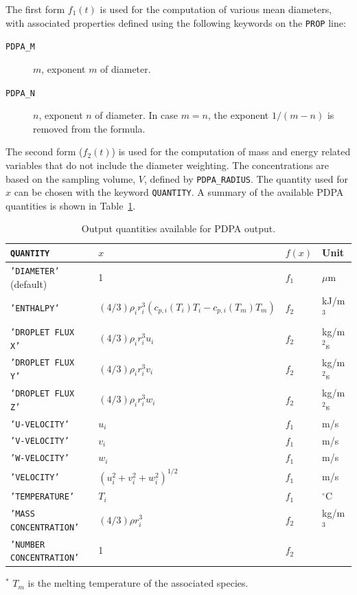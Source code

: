 \documentclass[11pt]{book}
\newcommand{\ct}{\tt\small}
\begin{document}
The first form $f_1(t)$ is used for the computation of various mean diameters, with
associated properties defined using the following keywords on the {\ct PROP} line:
\begin{description}
\item[{\ct PDPA\_M}] $m$, exponent $m$ of diameter.
\item[{\ct PDPA\_N}] $n$, exponent $n$ of diameter. In case $m=n$, the exponent $1/(m-n)$ is removed from the formula.
\end{description}
\noindent The second form ($f_2(t)$) is used for the computation of mass and energy related variables that do not include the diameter weighting.
The concentrations are based on the sampling volume, $V$, defined by {\ct PDPA\_RADIUS}.
The quantity used for $x$ can be chosen with the keyword {\ct QUANTITY}.
A summary of the available PDPA quantities is shown in Table~\ref{tbl:pdpa}.

\begin{table}[!ht]
\caption{Output quantities available for PDPA output.}
\label{tbl:pdpa}
\begin{center}
\begin{tabular}{|l|l|l|l|}
\hline
{\ct QUANTITY} 	        & $x$   			& $f(x)$ & Unit \\ \hline
{\ct 'DIAMETER'} (default) & 1                          & $f_1$	 & $\mu$m \\
{\ct 'ENTHALPY'} 	& $(4/3)\rho_i r_i^3 \left(c_{p,i}(T_i)T_i-c_{p,i}(T_m)T_m \right)$	& $f_2$	 & kJ/m$^3$ \\
{\ct 'DROPLET FLUX X'} 	& $(4/3)\rho_i r_i^3 u_i$ 	& $f_2$	 & kg/m$^2$s \\
{\ct 'DROPLET FLUX Y'} 	& $(4/3)\rho_i r_i^3 v_i$ 	& $f_2$	 & kg/m$^2$s \\
{\ct 'DROPLET FLUX Z'} 	& $(4/3)\rho_i r_i^3 w_i$ 	& $f_2$	 & kg/m$^2$s \\
{\ct 'U-VELOCITY'} 	& $u_i$ 			& $f_1$	 & m/s \\
{\ct 'V-VELOCITY'} 	& $v_i$ 			& $f_1$	 & m/s \\
{\ct 'W-VELOCITY'}	& $w_i$ 			& $f_1$	 & m/s \\
{\ct 'VELOCITY'} 	& $(u_i^2+v_i^2+w_i^2)^{1/2}$ 	& $f_1$	 & m/s \\
{\ct 'TEMPERATURE'} 	& $T_i$				& $f_1$  & ${}^\circ$C \\
{\ct 'MASS CONCENTRATION'} & $(4/3)\rho r_i^3 $         & $f_2$  & kg/m$^3$ \\
{\ct 'NUMBER CONCENTRATION'} & 1                        & $f_2$  & \\
 \hline
\end{tabular}
\end{center}
${}^*$ $T_m$ is the melting temperature of the associated species.
\end{table}
\end{document}
